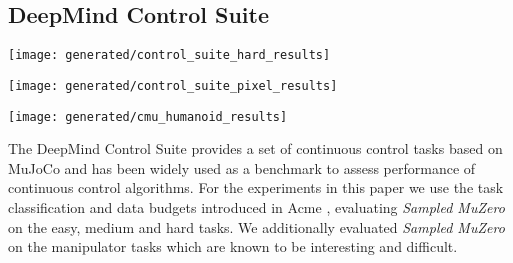 \documentclass{article}
\newcommand{\smuzero}{\emph{Sampled MuZero}}
\newcommand{\dmcs}{DeepMind Control Suite }
\begin{document}
\subsection{\dmcs}

\begin{figure*}
\texttt{[image: generated/control\_suite\_hard\_results]}
\vspace*{-7mm}
\caption[]{
\label{fig:control-suite-hard-results}
\textbf{Results in DM Control Suite Hard and Manipulator tasks.} Performance of \smuzero{} (3 seeds per experiment) throughout training compared to DMPO \cite{hoffman2020acme} and D4PG \cite{d4pg}. The x-axis shows millions of environment frames, the y-axis mean episode return. Hard tasks as proposed by \cite{hoffman2020acme}. Plot titles include the task name and the dimensionality of the action space.
}
\end{figure*}

\begin{figure*}
\texttt{[image: generated/control\_suite\_pixel\_results]}
\vspace*{-7mm}
\caption[]{
\label{fig:control-suite-pixel-results}
\textbf{Results in DM Control Suite Hard and Manipulator tasks of \smuzero{} learning from raw pixel inputs.} Performance of \smuzero{} (3 seeds per experiment) learning from raw pixel inputs throughout training compared to \smuzero{} learning from state inputs. The x-axis shows millions of environment frames, the y-axis mean episode return.
}
\end{figure*}

\begin{figure*}
\texttt{[image: generated/cmu\_humanoid\_results]}
\vspace*{-7mm}
\caption[]{
\label{fig:cmu-humanoid-results}
\textbf{Results for 56D CMU Humanoid Locomotion tasks.} Performance of \smuzero{} (1 seed per experiment) throughout training in dm\_control \cite{tassa2020dm_control} based CMU humanoid tasks, controlling a humanoid body with 56 action dimensions. \smuzero{} outperforms previously reported results for both forage, go-to-target and run-walls \cite{merel2018hierarchical} as well as run-gaps \cite{Song2020VMPO} while using more than an order of magnitude fewer environment interactions.
}
\end{figure*}

The \dmcs \cite{tassa2018deepmind} provides a set of continuous control tasks based on MuJoCo \cite{mujoco} and has been widely used as a benchmark to assess performance of continuous control algorithms. For the experiments in this paper we use the task classification and data budgets introduced in Acme \cite{hoffman2020acme}, evaluating \smuzero{} on the easy, medium and hard tasks. We additionally evaluated \smuzero{} on the manipulator tasks which are known to be interesting and difficult.
\end{document}
